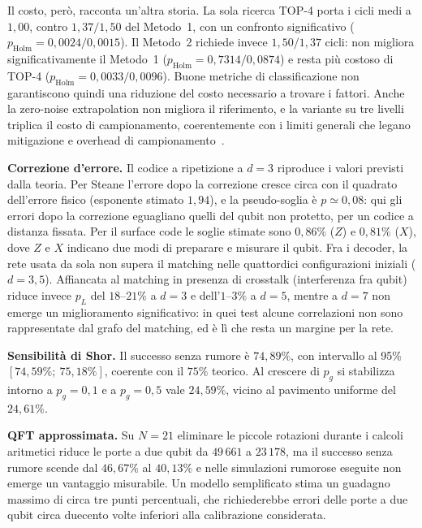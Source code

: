 Il costo, però, racconta un'altra storia.
La sola ricerca TOP-4 porta i cicli medi a $1{,}00$, contro $1{,}37/1{,}50$ del
Metodo~1, con un confronto significativo ($p_{\mathrm{Holm}}=0{,}0024/0{,}0015$).
Il Metodo~2 richiede invece $1{,}50/1{,}37$ cicli: non migliora
significativamente il Metodo~1 ($p_{\mathrm{Holm}}=0{,}7314/0{,}0874$) e resta
più costoso di TOP-4 ($p_{\mathrm{Holm}}=0{,}0033/0{,}0096$).
Buone metriche di classificazione non garantiscono quindi una riduzione del costo
necessario a trovare i fattori.
Anche la zero-noise extrapolation non migliora il riferimento, e la variante su
tre livelli triplica il costo di campionamento, coerentemente con i limiti
generali che legano mitigazione e overhead di campionamento~\cite{takagi2023}.

\textbf{Correzione d'errore.} Il codice a ripetizione a $d=3$ riproduce i valori
previsti dalla teoria.
Per Steane l'errore dopo la correzione cresce circa con il quadrato dell'errore
fisico (esponente stimato $1{,}94$), e la pseudo-soglia è $p\simeq0{,}08$: qui
gli errori dopo la correzione eguagliano quelli del qubit non protetto, per un
codice a distanza fissata.
Per il surface code le soglie stimate sono $0{,}86\%$ ($Z$) e $0{,}81\%$ ($X$),
dove $Z$ e $X$ indicano due modi di preparare e misurare il qubit.
Fra i decoder, la rete usata da sola non supera il matching nelle quattordici
configurazioni iniziali ($d=3,5$).
Affiancata al matching in presenza di crosstalk (interferenza fra qubit) riduce
invece $p_L$ del $18$--$21\%$ a $d=3$ e dell'$1$--$3\%$ a $d=5$, mentre a $d=7$
non emerge un miglioramento significativo: in quei test alcune correlazioni non
sono rappresentate dal grafo del matching, ed è lì che resta un margine per la
rete.

\textbf{Sensibilità di Shor.} Il successo senza rumore è $74{,}89\%$, con
intervallo al 95\% $[74{,}59\%;\ 75{,}18\%]$, coerente con il $75\%$ teorico.
Al crescere di $p_g$ si stabilizza intorno a $p_g=0{,}1$ e a $p_g=0{,}5$ vale
$24{,}59\%$, vicino al pavimento uniforme del $24{,}61\%$.

\textbf{QFT approssimata.} Su $N=21$ eliminare le piccole rotazioni durante i
calcoli aritmetici riduce le porte a due qubit da $49\,661$ a $23\,178$, ma il
successo senza rumore scende dal $46{,}67\%$ al $40{,}13\%$ e nelle simulazioni
rumorose eseguite non emerge un vantaggio misurabile.
Un modello semplificato stima un guadagno massimo di circa tre punti percentuali,
che richiederebbe errori delle porte a due qubit circa duecento volte inferiori
alla calibrazione considerata.


